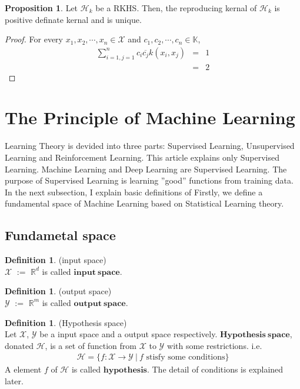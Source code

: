 \documentclass[11pt, a4paper, english, dvipdfmx]{jsarticle}
\theoremstyle{definition}
\newtheorem{Definition+}[Axiom+]{Definition}
\newtheorem{Proposition+}[Axiom+]{Proposition}
\newcommand{\R}{\mathbb{R}}
\newcommand{\K}{\mathbb{K}}
\newcommand{\X}{\mathcal{X}}
\newcommand{\Y}{\mathcal{Y}}
\newcommand{\Hil}{\mathcal{H}}
\begin{document}
\begin{Proposition+}
    Let $\Hil_{k}$ be a RKHS. Then, the reproducing kernal of $\Hil_{k}$ is positive 
    definate kernal and is unique. 
    \begin{proof}
        For every $x_{1}, x_{2}, \cdots, x_{n}\in\X$ and $c_{1}, c_{2}, \cdots, c_{n}\in\K$, 
        \begin{eqnarray*}
            \sum_{i = 1, j = 1}^{n}c_{i}\overline{c_{j}}k(x_{i}, x_{j}) &=& 1\\
                                                                        &=& 2
        \end{eqnarray*}
    \end{proof}
\end{Proposition+}

\section{The Principle of Machine Learning}
Learning Theory is devided into three parts: Supervised Learning, Unsupervised Learning and Reinforcement Learning. 
This article explains only Supervised Learning.
Machine Learning and Deep Learning are Supervised Learning. The purpose of Supervised
Learning is learning ''good” functions from training data. In the next subsection, I explain basic definitions of
Firstly, we define a fundamental space of Machine Learning based on Statistical Learning theory.
\subsection{Fundametal space }
\begin{Definition+}(input space)\\
    $\mathcal{X}$ $:=$ $\R^{d}$ is called $\mathbf{input~space}$.
\end{Definition+}
\begin{Definition+}(output space)\\
    $\mathcal{Y}$ $:=$ $\R^{m}$ is called $\mathbf{output~space}$.
\end{Definition+}
\begin{Definition+}(Hypothesis space)\\
      Let $\X$, $\Y$ be a input space and a output space respectively. $\mathbf{Hypothesis~space}$, donated $\Hil$, is a set of function from $\X$ to $\Y$ with some restrictions. i.e.
    \begin{align*}
        \Hil = \{f:\X\to\Y~|~f\text{ stisfy some conditions}\}
    \end{align*}
      A element $f$ of $\Hil$ is called $\mathbf{hypothesis}$. The detail of conditions is explained later.
\end{Definition+}
\end{document}

